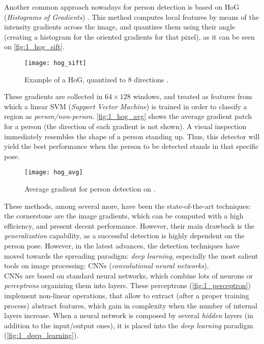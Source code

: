 Another common approach nowadays for person detection is based on HoG (\textit{Histograms of Gradients}) \cite{hog_detection}. This method computes local features by means of the intensity gradients across the image, and quantizes them using their angle (creating a histogram for the oriented gradients for that pixel), as it can be seen on \autoref{fig:1_hog_sift}.\\


\begin{figure}[h]
	\centering
	\texttt{[image: hog\_sift]}
	\caption{Example of a HoG, quantized to 8 directions \cite{diapos_cv_features}.}
	\label{fig:1_hog_sift}
\end{figure}



These gradients are collected in $64 \times 128$ windows, and treated as features from which a linear SVM (\textit{Support Vector Machine}) is trained in order to classify a region as \textit{person/non-person}. \autoref{fig:1_hog_avg} shows the average gradient patch for a person (the direction of each gradient is not shown). A visual inspection immediately resembles the shape of a person standing up. Thus, this detector will yield the best performance when the person to be detected stands in that specific pose.

\begin{figure}[h]
	\centering
	\texttt{[image: hog\_avg]}
	\caption{Average gradient for person detection on \cite{hog_detection}.}
	\label{fig:1_hog_avg}
\end{figure}



These methods, among several more, have been the state-of-the-art techniques: the cornerstone are the image gradients, which can be computed with a high efficiency,  and present decent performance. However, their main drawback is the \textit{generalization} capability, as a successful detection is highly dependent on the person pose. However, in the latest advances, the detection techniques have moved towards the spreading paradigm: \textit{deep learning}, especially the most salient tools on image processing: CNNs (\textit{convolutional neural networks}).\\

CNNs are based on standard neural networks, which combine lots of neurons or \textit{perceptrons} organizing them into layers. These perceptrons (\autoref{fig:1_perceptron}) implement non-linear operations, that allow to extract (after a proper training process) abstract features, which gain in complexity when the number of internal layers increase. When a neural network is composed by several \textit{hidden} layers (in addition to the input/output ones), it is placed into the \textit{deep learning} paradigm (\autoref{fig:1_deep_learning}).


